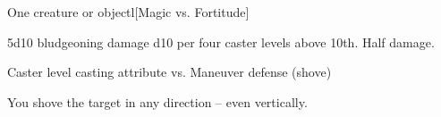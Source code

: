 \spellrng{\rngmed}
\begin{spelltarget}{One creature or object}l[Magic vs. Fortitude]
    \begin{spellmargin}
        \spellsuccess 5d10 bludgeoning damage \add d10 per four caster levels above 10th.
        \spellfailure Half damage.
    \end{spellmargin}
    \spellattack Caster level \add casting attribute  vs. Maneuver defense (shove)
    \begin{spellmargin}
        \spellsuccess You shove the target in any direction -- even vertically.
    \end{spellmargin}
\end{spelltarget}

